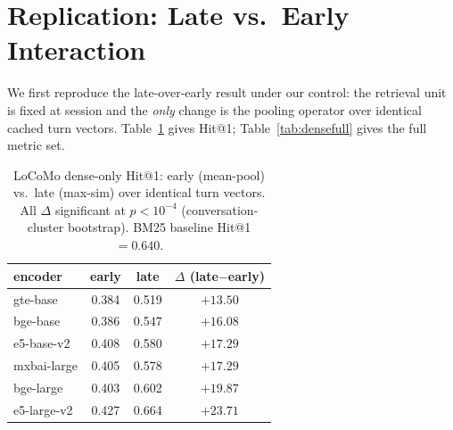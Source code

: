 \documentclass[10pt,twocolumn]{article}
\begin{document}
\section{Replication: Late vs.\ Early Interaction}
\label{sec:replicate}
We first reproduce the late-over-early result under our control: the retrieval
unit is fixed at session and the \emph{only} change is the pooling operator
over identical cached turn vectors. Table~\ref{tab:lateearly} gives Hit@1;
Table~\ref{tab:densefull} gives the full metric set.

\begin{table}[t]
\centering\small
\caption{LoCoMo dense-only Hit@1: early (mean-pool) vs.\ late (max-sim) over
identical turn vectors. All $\Delta$ significant at $p<10^{-4}$
(conversation-cluster bootstrap). BM25 baseline Hit@1 $=0.640$.}
\label{tab:lateearly}
\begin{tabular}{lccc}
\toprule
encoder & early & late & $\Delta$ (late$-$early) \\
\midrule
gte-base    & 0.384 & 0.519 & $+13.50$ \\
bge-base    & 0.386 & 0.547 & $+16.08$ \\
e5-base-v2  & 0.408 & 0.580 & $+17.29$ \\
mxbai-large & 0.405 & 0.578 & $+17.29$ \\
bge-large   & 0.403 & 0.602 & $+19.87$ \\
e5-large-v2 & 0.427 & 0.664 & $+23.71$ \\
\bottomrule
\end{tabular}
\end{table}
\end{document}
